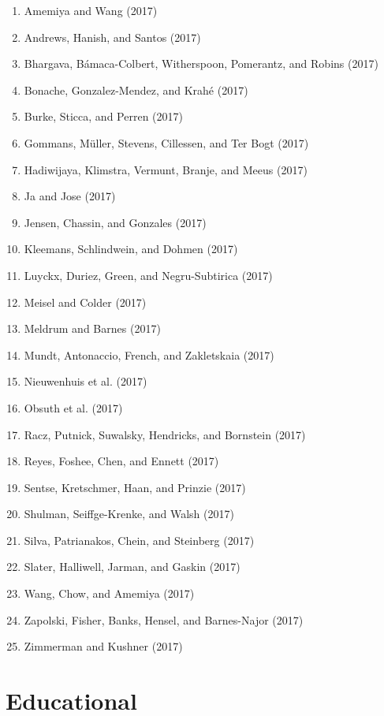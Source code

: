\documentclass[english,man]{apa6}
\providecommand{\tightlist}{%
  \setlength{\itemsep}{0pt}\setlength{\parskip}{0pt}}
\theoremstyle{definition}
\theoremstyle{definition}
\theoremstyle{definition}
\theoremstyle{remark}
\begin{document}
\begin{enumerate}
\def\labelenumi{\arabic{enumi})}
\tightlist
\item
  Amemiya and Wang (2017)
\item
  Andrews, Hanish, and Santos (2017)
\item
  Bhargava, Bámaca-Colbert, Witherspoon, Pomerantz, and Robins (2017)
\item
  Bonache, Gonzalez-Mendez, and Krahé (2017)
\item
  Burke, Sticca, and Perren (2017)
\item
  Gommans, Müller, Stevens, Cillessen, and Ter Bogt (2017)
\item
  Hadiwijaya, Klimstra, Vermunt, Branje, and Meeus (2017)
\item
  Ja and Jose (2017)
\item
  Jensen, Chassin, and Gonzales (2017)
\item
  Kleemans, Schlindwein, and Dohmen (2017)
\item
  Luyckx, Duriez, Green, and Negru-Subtirica (2017)
\item
  Meisel and Colder (2017)
\item
  Meldrum and Barnes (2017)
\item
  Mundt, Antonaccio, French, and Zakletskaia (2017)
\item
  Nieuwenhuis et al. (2017)
\item
  Obsuth et al. (2017)
\item
  Racz, Putnick, Suwalsky, Hendricks, and Bornstein (2017)
\item
  Reyes, Foshee, Chen, and Ennett (2017)
\item
  Sentse, Kretschmer, Haan, and Prinzie (2017)
\item
  Shulman, Seiffge-Krenke, and Walsh (2017)
\item
  Silva, Patrianakos, Chein, and Steinberg (2017)
\item
  Slater, Halliwell, Jarman, and Gaskin (2017)
\item
  Wang, Chow, and Amemiya (2017)
\item
  Zapolski, Fisher, Banks, Hensel, and Barnes-Najor (2017)
\item
  Zimmerman and Kushner (2017)
\end{enumerate}

\section{Educational}\label{educational}
\end{document}

